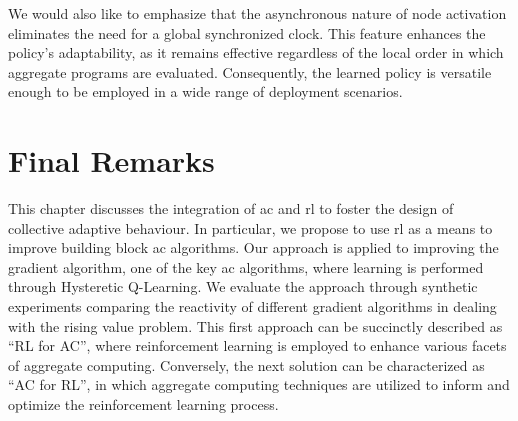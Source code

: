We would also like to emphasize that the asynchronous nature of node activation eliminates the need for a global synchronized clock. 
 This feature enhances the policy's adaptability, as it remains effective regardless of the local order in which aggregate programs are evaluated. Consequently, the learned policy is versatile enough to be employed in a wide range of deployment scenarios.
\section{Final Remarks}\label{coordination2022:s:conc}

This chapter discusses the integration of \acl{ac} and \acl{rl} to foster the design of collective adaptive behaviour.
% 
In particular, we propose to use \ac{rl} as a means to improve building block \ac{ac} algorithms. %
%
Our approach is applied to improving the gradient algorithm, one of the key \ac{ac} algorithms, where learning is performed through Hysteretic Q-Learning.
%
We evaluate the approach through synthetic experiments comparing the reactivity of different gradient algorithms in dealing with the rising value problem.
%
This first approach can be succinctly described as ``RL for AC'', 
 where reinforcement learning is employed to enhance various facets of aggregate computing. 
 Conversely, the next solution can be characterized as ``AC for RL'', in which aggregate computing techniques are utilized to inform and optimize the reinforcement learning process.
